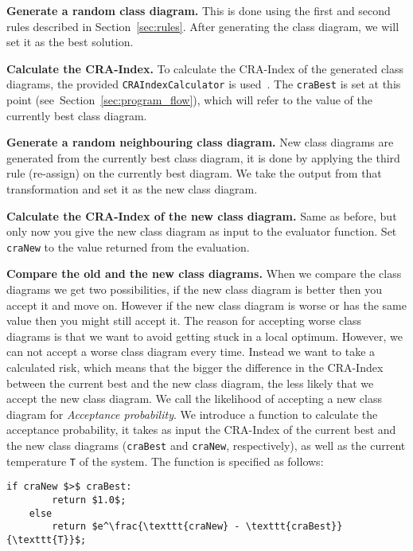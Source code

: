 \documentclass[a4paper]{article}
\begin{document}
\begin{description}
	
\item{\textbf{Generate a random class diagram.}}
This is done using the first and second rules described in Section~\ref{sec:rules}.
After generating the class diagram, we will set it as the best solution.

\item{\textbf{Calculate the CRA-Index.}}
To calculate the CRA-Index of the generated class diagrams, the provided \texttt{CRAIndexCalculator} is used~\cite{MOMoT}.
The \texttt{craBest} is set at this point (see~Section~\ref{sec:program_flow}), which will refer to the value of the currently best class diagram.

\item{\textbf{Generate a random neighbouring class diagram.}}
New class diagrams are generated from the currently best class diagram, it is
done by applying the third rule (re-assign) on the currently best diagram.
We take the output from that transformation and set it as the new class diagram.

\item{\textbf{Calculate the CRA-Index of the new class diagram.}}
Same as before, but only now you give the new class diagram as input to the
evaluator function.
Set \texttt{craNew} to the value returned from the evaluation.

\item{\textbf{Compare the old and the new class diagrams.}}
When we compare the class diagrams we get two possibilities, if the new class diagram is better then you accept it and move on.
However if the new class diagram is worse or has the same value then you might still accept it.
The reason for accepting worse class diagrams is that we want to avoid getting stuck in a local optimum.
However, we can not accept a worse class diagram every time.
Instead we want to take a calculated risk, which means that the bigger the difference in the CRA-Index between the current best and the new class diagram, the less likely that we accept the new class diagram.
We call the likelihood of accepting a new class diagram for \textit{Acceptance probability}.
We introduce a function to calculate the acceptance probability, it takes as input the CRA-Index of the current best and the new class diagrams (\texttt{craBest} and \texttt{craNew}, respectively), as well as the current temperature \texttt{T} of the system.
The function is specified as follows:

\begin{lstlisting}[mathescape=true]
	if craNew $>$ craBest:
		return $1.0$;
	else
		return $e^\frac{\texttt{craNew} - \texttt{craBest}}{\texttt{T}}$;
\end{lstlisting}


\end{description}
\end{document}
